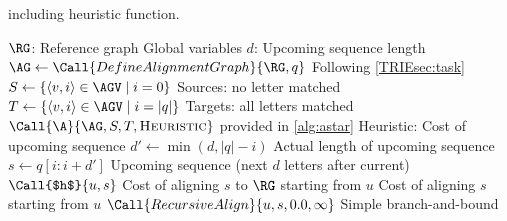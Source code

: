 \begin{algorithm}[H]
	\caption{\astarix including heuristic function.}\label{TRIEalg:astarix}
	\begin{algorithmic}[1]
		\State $\RG$: Reference graph \label{TRIElin:reference}
		\Comment Global variables
		\State $d$: Upcoming sequence length \label{TRIElin:d}
		\Statex
		 \label{TRIElin:astarix}
			\State $\AG \gets \Call{DefineAlignmentGraph}{\RG, q}$
			\Comment Following \cref{TRIEsec:task}
			\State $S \gets \{\langle v,i \rangle \in \AGV \mid i=0 \}$ \label{TRIElin:starts}
			\Comment Sources: no letter matched
			\State $T \gets \{\langle v,i \rangle \in \AGV \mid i=|q| \}$
			\Comment Targets: all letters matched
			\State \Return $\Call{\A}{\AG, S, T, \textsc{Heuristic}}$
			\Comment \A provided in \cref{alg:astar} \label{TRIElin:ret}
		\EndFunction
		\Statex
		 \label{TRIElin:heuristic-start}
		\Comment Heuristic: Cost of upcoming sequence
			\State $d' \gets \min(d, |q|-i)$
			\Comment Actual length of upcoming sequence
			\State $s \gets q[i:i+d']$ \label{TRIElin:s}
			\Comment Upcoming sequence (next $d$ letters after current)
			\State \Return $\Call{$h$}{u, s}$
			\label{TRIElin:align-upcoming}
			\Comment Cost of aligning $s$ to $\RG$ starting from $u$
		\EndFunction \label{TRIElin:heuristic-end}
		\Statex
		\Comment Cost of aligning $s$ starting from $u$
			\State \Return $\Call{RecursiveAlign}{u, s, 0.0, \infty}$
			\Comment Simple branch-and-bound \label{TRIElin:recursive-align}
		\EndFunction
	\end{algorithmic}
\end{algorithm}